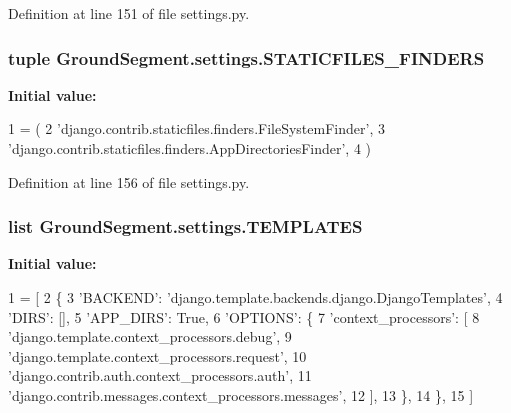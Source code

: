 Definition at line 151 of file settings.\+py.

\hypertarget{namespace_ground_segment_1_1settings_abf83e5e190e2a3cf3ae8d8bac305e750}{}
\subsubsection[{S\+T\+A\+T\+I\+C\+F\+I\+L\+E\+S\+\_\+\+F\+I\+N\+D\+E\+R\+S}]{\setlength{\rightskip}{0pt plus 5cm}tuple Ground\+Segment.\+settings.\+S\+T\+A\+T\+I\+C\+F\+I\+L\+E\+S\+\_\+\+F\+I\+N\+D\+E\+R\+S}\label{namespace_ground_segment_1_1settings_abf83e5e190e2a3cf3ae8d8bac305e750}
{\bfseries Initial value\+:}
\begin{DoxyCode}
1 = (
2     \textcolor{stringliteral}{'django.contrib.staticfiles.finders.FileSystemFinder'},
3     \textcolor{stringliteral}{'django.contrib.staticfiles.finders.AppDirectoriesFinder'},
4 )
\end{DoxyCode}


Definition at line 156 of file settings.\+py.

\hypertarget{namespace_ground_segment_1_1settings_aef52073a71704189e79714d515ba3de3}{}
\subsubsection[{T\+E\+M\+P\+L\+A\+T\+E\+S}]{\setlength{\rightskip}{0pt plus 5cm}list Ground\+Segment.\+settings.\+T\+E\+M\+P\+L\+A\+T\+E\+S}\label{namespace_ground_segment_1_1settings_aef52073a71704189e79714d515ba3de3}
{\bfseries Initial value\+:}
\begin{DoxyCode}
1 = [
2     \{
3         \textcolor{stringliteral}{'BACKEND'}: \textcolor{stringliteral}{'django.template.backends.django.DjangoTemplates'},
4         \textcolor{stringliteral}{'DIRS'}: [],
5         \textcolor{stringliteral}{'APP\_DIRS'}: \textcolor{keyword}{True},
6         \textcolor{stringliteral}{'OPTIONS'}: \{
7             \textcolor{stringliteral}{'context\_processors'}: [
8                 \textcolor{stringliteral}{'django.template.context\_processors.debug'},
9                 \textcolor{stringliteral}{'django.template.context\_processors.request'},
10                 \textcolor{stringliteral}{'django.contrib.auth.context\_processors.auth'},
11                 \textcolor{stringliteral}{'django.contrib.messages.context\_processors.messages'},
12             ],
13         \},
14     \},
15 ]
\end{DoxyCode}


